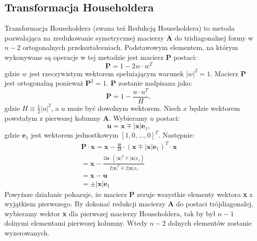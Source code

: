 \documentclass{article}
\begin{document}
\subsection{Transformacja Householdera}
Transformacja Householdera (zwana też Redukcją Householdera) to metoda pozwalająca na zredukowanie symetrycznej macierzy \textbf{A} do tridiagonalnej formy w $n-2$ ortogonalnych przekształceniach. Podstawowym elementem, na którym wykonywane są operacje w tej metodzie jest macierz \textbf{P} postaci:
\begin{equation}
\textbf{P} = 1 - 2w \cdot w^{T}
\end{equation}
gdzie $w$ jest rzeczywistym wektorem spełniającym warunek $|w|^2 = 1$. Macierz \textbf{P} jest ortogonalną ponieważ $\textbf{P}^2 = 1$.
\textbf{P} zostanie nadpisana jako:
\begin{equation}
\textbf{P} = 1 - \frac{u \cdot u^T}{H},
\end{equation}
gdzie $H \equiv \frac{1}{2} |u|^2 $, a $u$ może być dowolnym wektorem. Niech $x$ będzie wektorem powstałym z pierwszej kolumny \textbf{A}. Wybieramy $u$ postaci:
\begin{equation}
\textbf{u} = \textbf {x} \mp | \textbf{x} | \textbf{e}_1 ,
\end{equation}
gdzie $\textbf{e}_1$ jest wektorem jednostkowym $[1, 0 , . . .  ,0]^T$.  Następnie:
\begin{equation}
\begin{array}{c}
\textbf{P} \cdot \textbf{x} = \textbf{x} - \frac{\textbf{u}}{H} \cdot (\textbf{x} \mp |\textbf{x}|\textbf{e}_1)^T \cdot \textbf{x} \\
= \textbf{x} - \frac{2\textbf{u} \cdot (| \textbf{x}|^2 \mp | \textbf{x}| x_1)}{2| \textbf{x}|^2 \mp 2| \textbf{x}| x_1} \\
= \textbf{x} - \textbf{u} \\
= \pm |\textbf{x}| \textbf{e}_1
\end{array}
\end{equation}
Powyższe działanie pokazuje, że macierz \textbf{P} zeruje wszystkie elementy wektora \textbf{x} z wyjątkiem pierwszego. By dokonać redukcji macierzy \textbf{A} do postaci trójdiagonalej, wybieramy wektor \textbf{x} dla pierwszej macierzy Householdera, tak by był $n - 1$ dolnymi elementami pierwszej kolumny. Wtedy $n - 2$ dolnych elementów zostanie wyzerowanych.
\end{document}
